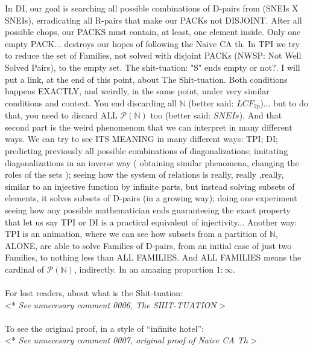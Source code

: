 		\noindent
		In DI, our goal is searching all possible combinations of D-pairs from (SNEIs X SNEIs), erradicating all R-pairs that make our PACKs not DISJOINT. After all possible chops, our PACKS must contain, at least, one element inside. Only one empty PACK... destroys our hopes of following the Naive CA th. In TPI we try to reduce the set of Families, not solved with disjoint PACKs (NWSP: Not Well Solved Pairs), to the empty set. The shit-tuation: "S" ends empty or not?. I will put a link, at the end of this point, about The Shit-tuation. Both conditions happens EXACTLY, and weirdly, in the same point, under very similar conditions and context. You end discarding all $\mathbb{N}$ (better said: $LCF_{2p}$)... but to do that, you need to discard ALL $\mathcal{P}(\mathbb{N})$ too (better said: $SNEIs$). And that second part is the weird phenomenom that we can interpret in many different ways. We can try to see ITS MEANING in many different ways: TPI; DI; predicting previously all possible combinations of diagonalizations; imitating diagonalizations in an inverse way ( obtaining similar phenomena, changing the roles of the sets ); seeing how the system of relations is really, really ,really, similar to an injective function by infinite parts, but instead solving subsets of elements, it solves subsets of D-pairs (in a growing way); doing one experiment seeing how any possible mathematician ends guaranteeing the exact property that let us say TPI or DI is a practical equivalent of injectivity... Another way: TPI is an animation, where we can see how subsets from a partition of $\mathbb{N}$, ALONE, are able to solve Families of D-pairs, from an initial case of just two Families, to nothing less than ALL FAMILIES. And ALL FAMILIES means the cardinal of $\mathcal{P}(\mathbb{N})$, indirectly. In an amazing proportion $1:\infty$.
		\\\\
		
		\noindent
		For lost readers, about what is the Shit-tuation:\\
		\textless ** \textit{See unnecesary comment 0006, The SHIT-TUATION} \textgreater
		\\\\
		
		\noindent
		To see the original proof, in a style of ``infinite hotel'':\\
		\textless ** \textit{See unnecesary comment 0007, original proof of Naive CA Th} \textgreater
		\\\\
		
